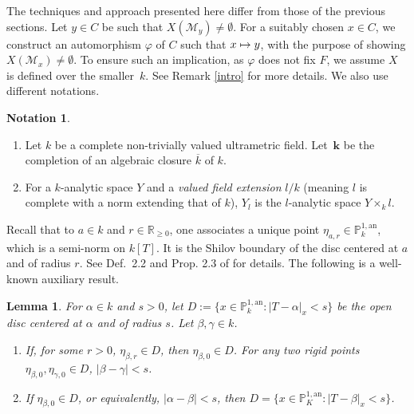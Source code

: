 \documentclass[JEP,XML,SOM,Unicode,NoFloatCountersInSection,published]{cedram}
\newcommand{\mto}{\mathchoice{\longmapsto}{\mapsto}{\mapsto}{\mapsto}}
\newcommand{\bbk}{{\boldsymbol{k}}}%
\newtheorem{lm}[thm]{Lemma}
\theoremstyle{definition}
\newtheorem{nota}[thm]{Notation}
\begin{document}
The techniques and approach presented here differ from those of the previous sections. Let $y \in C$ be such that $X(\mathscr{M}_y)\neq \emptyset$. For a suitably chosen $x \in C$, we construct an automorphism $\varphi$ of $C$ such that $x \mto y$, with the purpose of showing $X(\mathscr{M}_x) \neq \emptyset$. To ensure such an implication, as $\varphi$ does not fix $F$, we assume $X$ is defined over the smaller~$k$. See Remark \ref{intro} for more details.
We also use different notations.

\skpt
\begin{nota} \label{5.0}
\begin{enumerate}
\item
Let $k$ be a complete non-trivially valued ultrametric field. Let~$\bbk$ be the completion of an algebraic closure $\overline{k}$ of $k$.

\item
For a $k$-analytic space $Y$ and a \emph{valued field extension} $l/k$ (meaning $l$ is complete with a norm extending that of $k$), $Y_l$ is the $l$-analytic space $Y \times_k l$.
\end{enumerate}
\end{nota}

Recall that to $a \in k$ and $r \in \mathbb{R}_{\geqslant 0}$, one associates a unique point $\eta_{a,r} \in \mathbb{P}_{k}^{1, \mathrm{an}}$, which is a semi-norm on $k[T]$. It is the Shilov boundary of the disc centered at $a$ and of radius $r$. See Def.~2.2 and Prop. 2.3 of \cite{une} for details. The following is a well-known auxiliary result.

\begin{lm} \label{5.2} For $\alpha \in k$ and $s>0$, let $D:=\{x \in \mathbb{P}_k^{1, \mathrm{an}}: |T- \alpha|_x<s\}$ be the open disc centered at $\alpha$ and of radius $s$.
Let $\beta, \gamma \in k$.

\begin{enumerate}
\item
If, for some $r\!>\!0$, $\eta_{\beta, r}\!\in\! D$, then $\eta_{\beta,0} \!\in\! D$. For any two rigid points \hbox{$\eta_{\beta, 0}, \eta_{\gamma,0}\!\in\! D$}, $|\beta-\gamma|<s$.

\item
If $\eta_{\beta, 0} \in D$, or equivalently, $|\alpha-\beta|<s$, then $D=\{x \in \mathbb{P}_{K}^{1, \mathrm{an}}: |T-\beta|_x <s\}$.
\end{enumerate}
\end{lm}
\end{document}
